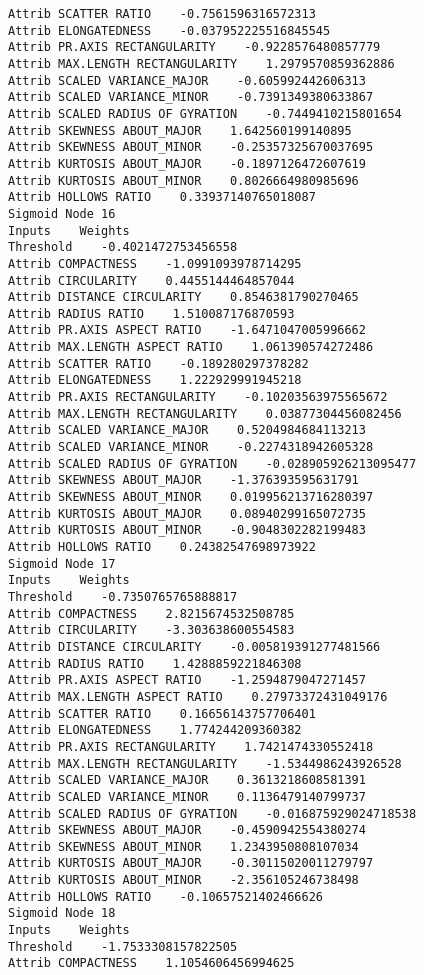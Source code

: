 \documentclass[
	article,			%
	11pt,				%
	oneside,			%
	a4paper,			%
	english,			%
	brazil,				%
	sumario=tradicional
	]{abntex2}
\begin{document}
\begin{lstlisting}
Attrib SCATTER RATIO    -0.7561596316572313
Attrib ELONGATEDNESS    -0.037952225516845545
Attrib PR.AXIS RECTANGULARITY    -0.9228576480857779
Attrib MAX.LENGTH RECTANGULARITY    1.2979570859362886
Attrib SCALED VARIANCE_MAJOR    -0.605992442606313
Attrib SCALED VARIANCE_MINOR    -0.7391349380633867
Attrib SCALED RADIUS OF GYRATION    -0.7449410215801654
Attrib SKEWNESS ABOUT_MAJOR    1.642560199140895
Attrib SKEWNESS ABOUT_MINOR    -0.25357325670037695
Attrib KURTOSIS ABOUT_MAJOR    -0.1897126472607619
Attrib KURTOSIS ABOUT_MINOR    0.8026664980985696
Attrib HOLLOWS RATIO    0.33937140765018087
Sigmoid Node 16
Inputs    Weights
Threshold    -0.4021472753456558
Attrib COMPACTNESS    -1.0991093978714295
Attrib CIRCULARITY    0.4455144464857044
Attrib DISTANCE CIRCULARITY    0.8546381790270465
Attrib RADIUS RATIO    1.510087176870593
Attrib PR.AXIS ASPECT RATIO    -1.6471047005996662
Attrib MAX.LENGTH ASPECT RATIO    1.061390574272486
Attrib SCATTER RATIO    -0.189280297378282
Attrib ELONGATEDNESS    1.222929991945218
Attrib PR.AXIS RECTANGULARITY    -0.10203563975565672
Attrib MAX.LENGTH RECTANGULARITY    0.03877304456082456
Attrib SCALED VARIANCE_MAJOR    0.5204984684113213
Attrib SCALED VARIANCE_MINOR    -0.2274318942605328
Attrib SCALED RADIUS OF GYRATION    -0.028905926213095477
Attrib SKEWNESS ABOUT_MAJOR    -1.376393595631791
Attrib SKEWNESS ABOUT_MINOR    0.019956213716280397
Attrib KURTOSIS ABOUT_MAJOR    0.08940299165072735
Attrib KURTOSIS ABOUT_MINOR    -0.9048302282199483
Attrib HOLLOWS RATIO    0.24382547698973922
Sigmoid Node 17
Inputs    Weights
Threshold    -0.7350765765888817
Attrib COMPACTNESS    2.8215674532508785
Attrib CIRCULARITY    -3.303638600554583
Attrib DISTANCE CIRCULARITY    -0.005819391277481566
Attrib RADIUS RATIO    1.4288859221846308
Attrib PR.AXIS ASPECT RATIO    -1.2594879047271457
Attrib MAX.LENGTH ASPECT RATIO    0.27973372431049176
Attrib SCATTER RATIO    0.16656143757706401
Attrib ELONGATEDNESS    1.774244209360382
Attrib PR.AXIS RECTANGULARITY    1.7421474330552418
Attrib MAX.LENGTH RECTANGULARITY    -1.5344986243926528
Attrib SCALED VARIANCE_MAJOR    0.3613218608581391
Attrib SCALED VARIANCE_MINOR    0.1136479140799737
Attrib SCALED RADIUS OF GYRATION    -0.016875929024718538
Attrib SKEWNESS ABOUT_MAJOR    -0.4590942554380274
Attrib SKEWNESS ABOUT_MINOR    1.2343950808107034
Attrib KURTOSIS ABOUT_MAJOR    -0.30115020011279797
Attrib KURTOSIS ABOUT_MINOR    -2.356105246738498
Attrib HOLLOWS RATIO    -0.10657521402466626
Sigmoid Node 18
Inputs    Weights
Threshold    -1.7533308157822505
Attrib COMPACTNESS    1.1054606456994625

\end{lstlisting}
\end{document}
